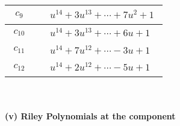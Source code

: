 \documentclass[1p]{elsarticle_modified}
\theoremstyle{definition}
\begin{document}
\begin{tabular}{m{50pt}|m{274pt}}
\hline $$\begin{aligned}c_{9}\end{aligned}$$&$\begin{aligned}
&u^{14}+3 u^{13}+\cdots+7 u^2+1
\end{aligned}$\\
\hline $$\begin{aligned}c_{10}\end{aligned}$$&$\begin{aligned}
&u^{14}+3 u^{13}+\cdots+6 u+1
\end{aligned}$\\
\hline $$\begin{aligned}c_{11}\end{aligned}$$&$\begin{aligned}
&u^{14}+7 u^{12}+\cdots-3 u+1
\end{aligned}$\\
\hline $$\begin{aligned}c_{12}\end{aligned}$$&$\begin{aligned}
&u^{14}+2 u^{12}+\cdots-5 u+1
\end{aligned}$\\
\hline
\end{tabular}\\~\\
\newpage\renewcommand{\arraystretch}{1}
\flushleft \textbf{(v) Riley Polynomials at the component}\newline \\
\end{document}

